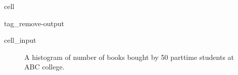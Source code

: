 \documentclass[letterpaper,10pt,english]{jupyterBook}
\begin{document}
\begin{sphinxuseclass}{cell}
\begin{sphinxuseclass}{tag_remove-output}\begin{sphinxVerbatimInput}

\begin{sphinxuseclass}{cell_input}
\begin{sphinxVerbatim}[commandchars=\\\{\}]

\end{sphinxVerbatim}

\end{sphinxuseclass}\end{sphinxVerbatimInput}

\end{sphinxuseclass}
\end{sphinxuseclass}
\begin{figure}[htbp]
\centering
\capstart

\noindent{}
\caption{A histogram of number of books bought by 50 part\sphinxhyphen{}time students at ABC college.}\label{\detokenize{Ch1 Sampling and Data/1.4 Tables and Charts:books-hist}}\end{figure}
\end{document}
